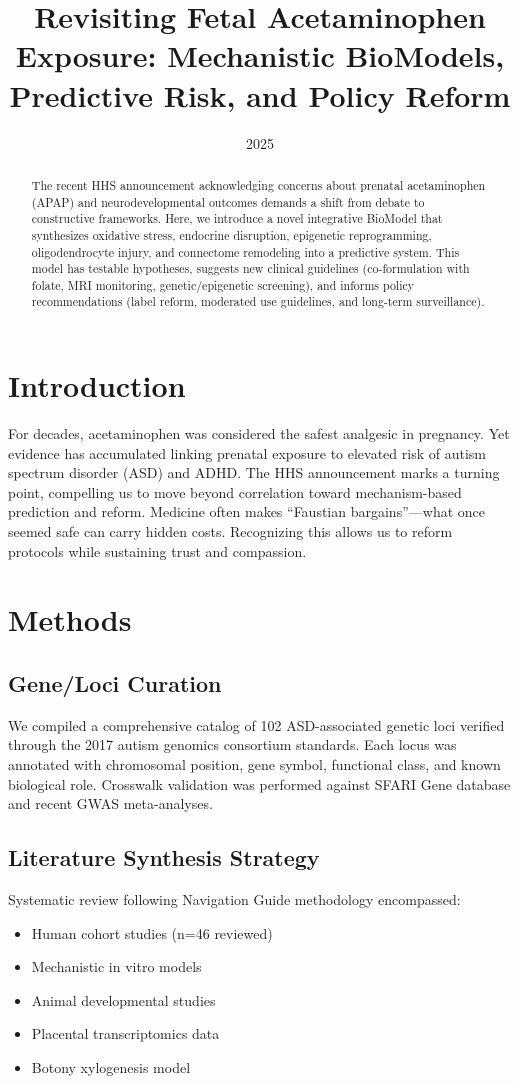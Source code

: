 \documentclass[12pt]{article}
\title{Revisiting Fetal Acetaminophen Exposure: Mechanistic BioModels, Predictive Risk, and Policy Reform}
\author{}
\date{2025}
\begin{document}
\maketitle

\begin{abstract}
The recent HHS announcement acknowledging concerns about prenatal acetaminophen (APAP) and neurodevelopmental outcomes demands a shift from debate to constructive frameworks. Here, we introduce a novel integrative BioModel that synthesizes oxidative stress, endocrine disruption, epigenetic reprogramming, oligodendrocyte injury, and connectome remodeling into a predictive system. This model has testable hypotheses, suggests new clinical guidelines (co-formulation with folate, MRI monitoring, genetic/epigenetic screening), and informs policy recommendations (label reform, moderated use guidelines, and long-term surveillance).
\end{abstract}

\section{Introduction}
For decades, acetaminophen was considered the safest analgesic in pregnancy. Yet evidence has accumulated linking prenatal exposure to elevated risk of autism spectrum disorder (ASD) and ADHD. The HHS announcement marks a turning point, compelling us to move beyond correlation toward mechanism-based prediction and reform. Medicine often makes ``Faustian bargains''---what once seemed safe can carry hidden costs. Recognizing this allows us to reform protocols while sustaining trust and compassion.

\section{Methods}

\subsection{Gene/Loci Curation}
We compiled a comprehensive catalog of 102 ASD-associated genetic loci verified through the 2017 autism genomics consortium standards. Each locus was annotated with chromosomal position, gene symbol, functional class, and known biological role. Crosswalk validation was performed against SFARI Gene database and recent GWAS meta-analyses.

\subsection{Literature Synthesis Strategy}
Systematic review following Navigation Guide methodology encompassed:
\begin{itemize}
    \item Human cohort studies (n=46 reviewed)
    \item Mechanistic in vitro models
    \item Animal developmental studies
    \item Placental transcriptomics data
    \item Botony xylogenesis model
\end{itemize}
\end{document}

